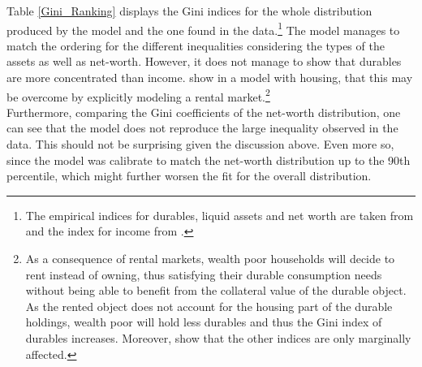 \documentclass[a4paper,12pt,legno]{article}
\begin{document}
Table \ref{Gini_Ranking} displays the Gini indices for the whole distribution produced by the model and the one found in the data.\footnote{The empirical indices for durables, liquid assets and net worth are taken from \cite{hintermaier2010} and the index for income from \cite{hintermaier2011}.} The model manages to match the ordering for the different inequalities considering the types of the assets as well as net-worth. However, it does not manage to show that durables are more concentrated than income. \cite{diaz2010} show in a model with housing, that this may be overcome by explicitly modeling a rental market.\footnote{As a consequence of rental markets, wealth poor households will decide to rent instead of owning, thus satisfying their durable consumption needs without being able to benefit from the collateral value of the durable object. As the rented object does not account for the housing part of the durable holdings, wealth poor will hold less durables and thus the Gini index of durables increases. Moreover, \cite{diaz2010} show that the other indices are only marginally affected.} \\
Furthermore, comparing the Gini coefficients of the net-worth distribution, one can see that the model does not reproduce the large inequality observed in the data. This should not be surprising given the discussion above. Even more so, since the model was calibrate to match the net-worth distribution up to the 90th percentile, which might further worsen the fit for the overall distribution.  
\end{document}
